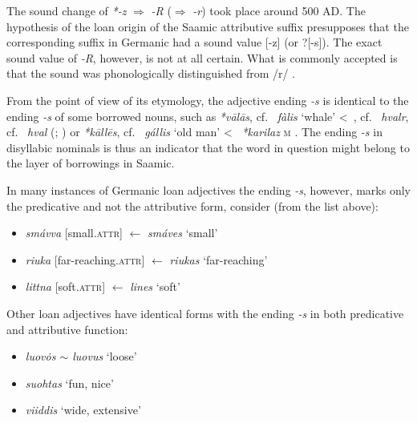 {The sound change of  \textit{*-z} $\Rightarrow$  \textit{-R} ($\Rightarrow$  \textit{-r}) took place around 500 AD. The hypothesis of the loan origin of the Saamic attributive suffix presupposes that the corresponding suffix in Germanic had a sound value [-z] (or ?[-s]). The exact sound value of \textit{-R}, however, is not at all certain. What is commonly accepted is that the sound was phonologically distinguished from /r/ \citep{skold1954}.

From the point of view of its etymology, the adjective ending \textit{-s} is identical to the ending \textit{-s} of some borrowed  nouns, such as  \textit{*vālās}, cf.~ \textit{fàlis} ‘whale’ <~, cf.~ \textit{hvalr}, cf.~ \textit{hval} (\citealt[144]{qvigstad1893}; \citealt[144–145]{lehtiranta1989}) or  \textit{*kāllēs}, cf.~ \textit{gállis} ‘old man’ <~ \textit{*karilaz} \textsc{m} \citep[44–45]{lehtiranta1989}. The ending \textit{-s} in disyllabic nominals is thus an indicator that the word in question might belong to the layer of  borrowings in Saamic.

In many instances of Germanic loan adjectives the ending \textit{-s}, however, marks only the predicative and not the attributive form, consider (from the list above):
\begin{itemize}
\item {} \textit{smávva} [small.\textsc{attr}] $\leftarrow$ \textit{smáves} ‘small’
\item {} \textit{riuka} [far-reaching.\textsc{attr}] $\leftarrow$ \textit{riukas} ‘far-reaching’
\item {} \textit{littna} [soft.\textsc{attr}] $\leftarrow$ \textit{lines} ‘soft’
\end{itemize}

Other loan adjectives have identical forms with the ending \textit{-s} in both predicative and attributive function:
\begin{itemize}
\item {} \textit{luov\.{o}s $\sim$ luovus} ‘loose'
\item {} \textit{suohtas} ‘fun, nice'
\item {} \textit{viiddis} ‘wide, extensive'
\end {itemize}

}
